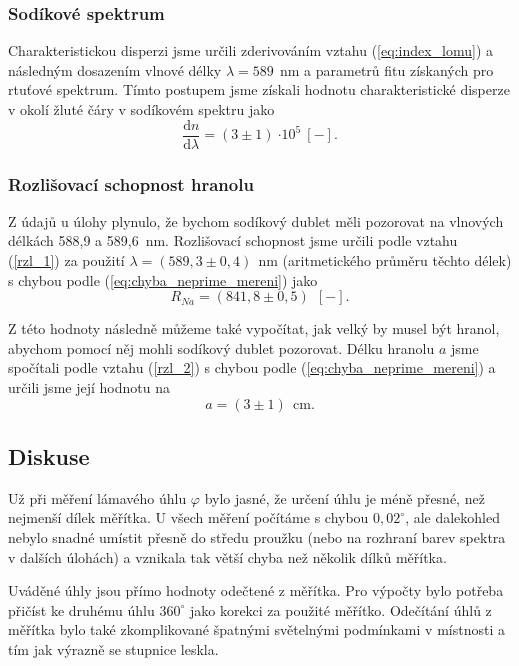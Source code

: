 \documentclass[english]{article}
\newcommand{\unit}[1]{\ \mathrm{#1}}
\newcommand{\dd}{\mathrm{d}}
\begin{document}
		\subsubsection{Sodíkové spektrum}
			Charakteristickou disperzi jsme určili zderivováním vztahu (\ref{eq:index_lomu}) a následným dosazením vlnové délky $\lambda = 589~\unit{nm}$ a parametrů fitu získaných pro rtuťové spektrum. Tímto postupem jsme získali hodnotu charakteristické disperze v okolí žluté čáry v sodíkovém spektru jako
			\begin{equation}
				\frac{\dd n}{\dd \lambda} = ( 3 \pm 1 )\unit{\cdot 10^5~[-]}.
			\end{equation}
		
		\subsubsection{Rozlišovací schopnost hranolu}
			Z údajů u úlohy plynulo, že bychom sodíkový dublet měli pozorovat na vlnových délkách 588,9 a 589,6~nm. Rozlišovací schopnost jsme určili podle vztahu (\ref{rzl_1}) za použití $\lambda=(589,3\pm0,4)\unit{~nm}$ (aritmetického průměru těchto délek) s chybou podle (\ref{eq:chyba_neprime_mereni}) jako
			\begin{equation}
				R_{Na} = ( 841,8 \pm 0,5 )~\unit{[-]}.
			\end{equation}
			
			Z této hodnoty následně můžeme také vypočítat, jak velký by musel být hranol, abychom pomocí něj mohli sodíkový dublet pozorovat. Délku hranolu $a$ jsme spočítali podle vztahu (\ref{rzl_2})  s chybou podle (\ref{eq:chyba_neprime_mereni}) a určili jsme její hodnotu na
			\begin{equation}
				a = (3 \pm 1) ~\unit{cm}.
			\end{equation}
		
	\subsection{Diskuse}
		Už při měření lámavého úhlu $\varphi$ bylo jasné, že určení úhlu je méně přesné, než nejmenší dílek měřítka. U všech měření počítáme s chybou $0,02^\circ$, ale dalekohled nebylo snadné umístit přesně do středu proužku (nebo na rozhraní barev spektra v dalších úlohách) a vznikala tak větší chyba než několik dílků měřítka.
		
		Uváděné úhly jsou přímo hodnoty odečtené z měřítka. Pro výpočty bylo potřeba přičíst ke druhému úhlu $360^\circ$ jako korekci za použité měřítko. Odečítání úhlů z měřítka bylo také zkomplikované špatnými světelnými podmínkami v místnosti a tím jak výrazně se stupnice leskla.
		
\end{document}
